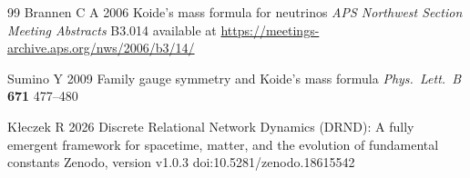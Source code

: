 \documentclass[12pt]{iopart}
\begin{document}
\begin{thebibliography}{99}
Brannen C A 2006
Koide's mass formula for neutrinos
\textit{APS Northwest Section Meeting Abstracts}
B3.014
available at \url{https://meetings-archive.aps.org/nws/2006/b3/14/}

Sumino Y 2009
Family gauge symmetry and Koide's mass formula
\textit{Phys.\ Lett.\ B} \textbf{671} 477--480


K\l{}eczek R 2026
Discrete Relational Network Dynamics (DRND): A fully emergent framework for spacetime, matter, and the evolution of fundamental constants
Zenodo, version v1.0.3
doi:10.5281/zenodo.18615542

\end{thebibliography}
\end{document}
